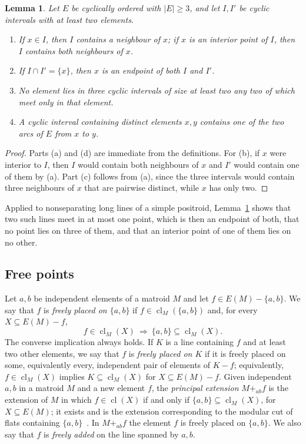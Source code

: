 \documentclass[11pt]{amsart}
\newtheorem{lemma}[theorem]{Lemma}
\theoremstyle{definition}
\theoremstyle{remark}
\numberwithin{equation}{section}
\newcommand{\cl}{\operatorname{cl}}
\begin{document}
\begin{lemma}\label{lem:intervals}
Let $E$ be cyclically ordered with $|E|\ge3$, and let $I,I'$ be cyclic intervals with at least two elements.
\begin{enumerate}[label=\textup{(\alph*)}]
\item If $x\in I$, then $I$ contains a neighbour of $x$; if $x$ is an interior point of $I$, then $I$ contains both neighbours of $x$.
\item If $I\cap I'=\{x\}$, then $x$ is an endpoint of both $I$ and $I'$.
\item No element lies in three cyclic intervals of size at least two any two of which meet only in that element.
\item A cyclic interval containing distinct elements $x,y$ contains one of the two arcs of $E$ from $x$ to $y$.
\end{enumerate}
\end{lemma}

\begin{proof}
Parts (a) and (d) are immediate from the definitions. For (b), if $x$ were interior to $I$, then $I$ would contain both neighbours of $x$ and $I'$ would contain one of them by (a). Part (c) follows from (a), since the three intervals would contain three neighbours of $x$ that are pairwise distinct, while $x$ has only two.
\end{proof}

Applied to nonseparating long lines of a simple positroid, Lemma~\ref{lem:intervals} shows that two such lines meet in at most one point, which is then an endpoint of both, that no point lies on three of them, and that an interior point of one of them lies on no other.

\subsection{Free points}\label{sec:free}
Let $a,b$ be independent elements of a matroid $M$ and let $f\in E(M)-\{a,b\}$. We say that $f$ is \emph{freely placed on $\{a,b\}$} if $f\in\cl_M(\{a,b\})$ and, for every $X\subseteq E(M)-f$,
\[
f\in\cl_M(X)\ \Longrightarrow\ \{a,b\}\subseteq\cl_M(X).
\]
The converse implication always holds. If $K$ is a line containing $f$ and at least two other elements, we say that $f$ is \emph{freely placed on $K$} if it is freely placed on some, equivalently every, independent pair of elements of $K-f$; equivalently, $f\in\cl_M(X)$ implies $K\subseteq\cl_M(X)$ for $X\subseteq E(M)-f$. Given independent $a,b$ in a matroid $M$ and a new element $f$, the \emph{principal extension} $M+_{ab}f$ is the extension of $M$ in which $f\in\cl(X)$ if and only if $\{a,b\}\subseteq\cl_M(X)$, for $X\subseteq E(M)$; it exists and is the extension corresponding to the modular cut of flats containing $\{a,b\}$~\cite[Section~7.2]{Oxl11}. In $M+_{ab}f$ the element $f$ is freely placed on $\{a,b\}$. We also say that $f$ is \emph{freely added} on the line spanned by $a,b$.
\end{document}
